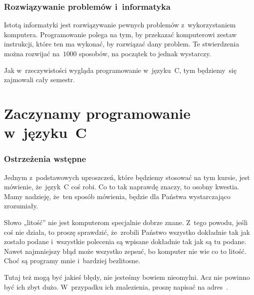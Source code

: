 \documentclass[10pt,t]{beamer}
\begin{document}
\begin{frame}
  \frametitle{Rozwiązywanie problemów i~informatyka}


  Istotą informatyki jest rozwiązywanie pewnych problemów z~wykorzystaniem
  komputera. Programowanie polega na tym, by przekazać komputerowi zestaw
  instrukcji, które ten ma wykonać, by rozwiązać dany problem. Te
  stwierdzenia można rozwijać na~$1000$ sposobów, na początek to jednak
  wystarczy.

  Jak w~rzeczywistości wygląda programowanie w~języku~C, tym będziemy~się
  zajmowali cały semestr.

\end{frame}










\section{Zaczynamy programowanie w~języku~C}


\begin{frame}
  \frametitle{Ostrzeżenia wstępne}


  Jednym z~podstawowych uproszczeń, które będziemy stosować na tym kursie,
  jest mówienie, że~język~C coś robi. Co to tak naprawdę znaczy, to osobny
  kwestia. Mamy nadzieję, że~ten sposób mówienia, będzie dla Państwa
  wystarczająco zrozumiały.

  Słowo „litość” nie jest komputerom specjalnie dobrze znane. Z~tego
  powodu, jeśli coś nie działa, to proszę sprawdzić, że~zrobili
  Państwo \alert{wszystko} dokładnie tak jak zostało podane i~wszystkie
  polecenia są wpisane \alert{dokładnie} tak jak są tu podane. Nawet
  najmniejszy błąd może wszystko zepsuć, bo komputer nie wie co to litość.
  Choć są programy mnie i~bardziej bezlitosne.

  Tutaj też mogą być jakieś błędy, nie jesteśmy bowiem nieomylni.
  Acz nie powinno być ich zbyt dużo. W~przypadku ich znalezienia, proszę
  napisać na adres~\email.

\end{frame}
\end{document}
